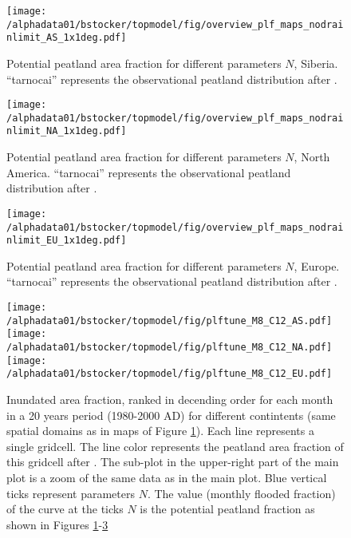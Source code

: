 \begin{figure}[ht!]
  \texttt{[image: /alphadata01/bstocker/topmodel/fig/overview\_plf\_maps\_nodrainlimit\_AS\_1x1deg.pdf]}
\caption[Potential peatland area fraction for different parameters $N$, Siberia]{Potential peatland area fraction for different parameters $N$, Siberia. ``tarnocai'' represents the observational peatland distribution after \citet{tarnocai09gbc}.}
\label{fig:plftune.map.as}
\end{figure}

\begin{figure}[ht!]
  \texttt{[image: /alphadata01/bstocker/topmodel/fig/overview\_plf\_maps\_nodrainlimit\_NA\_1x1deg.pdf]}
\caption[Potential peatland area fraction for different parameters $N$, North America]{Potential peatland area fraction for different parameters $N$, North America. ``tarnocai'' represents the observational peatland distribution after \citet{tarnocai09gbc}.}
\label{fig:plftune.map.na}
\end{figure}

\begin{figure}[ht!]
  \texttt{[image: /alphadata01/bstocker/topmodel/fig/overview\_plf\_maps\_nodrainlimit\_EU\_1x1deg.pdf]}
\caption[Potential peatland area fraction for different parameters $N$, Europe]{Potential peatland area fraction for different parameters $N$, Europe. ``tarnocai'' represents the observational peatland distribution after \citet{tarnocai09gbc}.}
\label{fig:plftune.map.eu}
\end{figure}

\begin{figure}[ht!]
  \texttt{[image: /alphadata01/bstocker/topmodel/fig/plftune\_M8\_C12\_AS.pdf]}
  \texttt{[image: /alphadata01/bstocker/topmodel/fig/plftune\_M8\_C12\_NA.pdf]}
  \texttt{[image: /alphadata01/bstocker/topmodel/fig/plftune\_M8\_C12\_EU.pdf]}
\caption[Monthly inundated area fraction, ranked in decending order for different contintents]{Inundated area fraction, ranked in decending order for each month in a 20 years period (1980-2000 AD) for different contintents (same spatial domains as in maps of Figure \ref{fig:plftune.map.as}). Each line represents a single gridcell. The line color represents the peatland area fraction of this gridcell after \citet{tarnocai09gbc}. The sub-plot in the upper-right part of the main plot is a zoom of the same data as in the main plot. Blue vertical ticks represent parameters $N$. The value (monthly flooded fraction) of the curve at the ticks $N$ is the potential peatland fraction as shown in Figures \ref{fig:plftune.map.as}-\ref{fig:plftune.map.eu}}
\label{fig:plftune.curves}
\end{figure}

